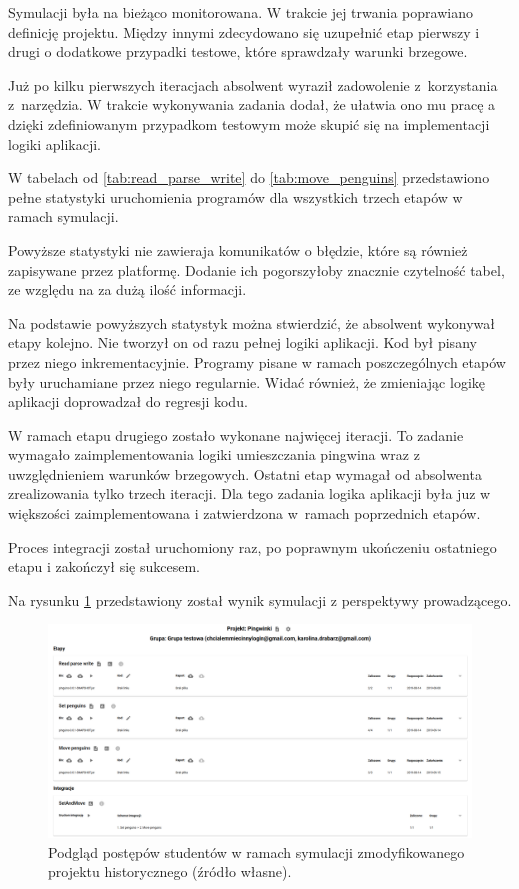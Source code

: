 Symulacji była na bieżąco monitorowana.
W trakcie jej trwania poprawiano definicję projektu.
Między innymi zdecydowano się uzupełnić etap pierwszy i drugi o dodatkowe przypadki testowe, które sprawdzały warunki brzegowe.

Już po kilku pierwszych iteracjach absolwent wyraził zadowolenie z~korzystania z~narzędzia.
W trakcie wykonywania zadania dodał, że ułatwia ono mu pracę a dzięki zdefiniowanym przypadkom testowym może skupić się na implementacji logiki aplikacji.

W tabelach od \ref{tab:read_parse_write} do \ref{tab:move_penguins} przedstawiono pełne statystyki uruchomienia programów dla wszystkich trzech etapów w ramach symulacji.









Powyższe statystyki nie zawieraja komunikatów o błędzie, które są również zapisywane przez platformę.
Dodanie ich pogorszyłoby znacznie czytelność tabel, ze względu na za dużą ilość informacji.

Na podstawie powyższych statystyk można stwierdzić, że absolwent wykonywał etapy kolejno.
Nie tworzył on od razu pełnej logiki aplikacji.
Kod był pisany przez niego inkrementacyjnie.
Programy pisane w ramach poszczególnych etapów były uruchamiane przez niego regularnie.
Widać również, że zmieniając logikę aplikacji doprowadzał do regresji kodu.

W ramach etapu drugiego zostało wykonane najwięcej iteracji.
To zadanie wymagało zaimplementowania logiki umieszczania pingwina wraz z uwzględnieniem warunków brzegowych.
Ostatni etap wymagał od absolwenta zrealizowania tylko trzech iteracji.
Dla tego zadania logika aplikacji była juz w większości zaimplementowana i zatwierdzona w~ramach poprzednich etapów.

Proces integracji został uruchomiony raz, po poprawnym ukończeniu ostatniego etapu i zakończył się sukcesem.

Na rysunku \ref{fig:penguins_simulation_interface} przedstawiony został wynik symulacji z perspektywy prowadzącego.

\begin{figure}[h]
    \centering
    \includegraphics[width = 13cm]{chapter07/penguins_preview.png}
    \caption{Podgląd postępów studentów w ramach symulacji zmodyfikowanego projektu historycznego (źródło własne).}
    \label{fig:penguins_simulation_interface}
\end{figure}


